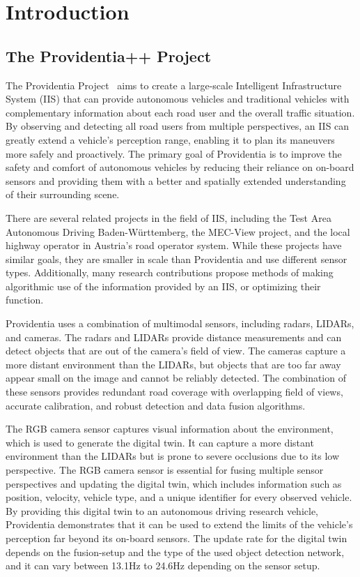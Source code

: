 
\chapter{Introduction}
\label{ch:intro}

\section{The Providentia++ Project}
\label{sec:providentia}

The Providentia Project~\cite{krammer2022providentia} aims to create a large-scale Intelligent Infrastructure System (IIS) that can provide autonomous vehicles and traditional vehicles with complementary information about each road user and the overall traffic situation.
By observing and detecting all road users from multiple perspectives, an IIS can greatly extend a vehicle's perception range, enabling it to plan its maneuvers more safely and proactively.
The primary goal of Providentia is to improve the safety and comfort of autonomous vehicles by reducing their reliance on on-board sensors and providing them with a better and spatially extended understanding of their surrounding scene.

There are several related projects in the field of IIS, including the Test Area Autonomous Driving Baden-Württemberg, the MEC-View project, and the local highway operator in Austria's road operator system.
While these projects have similar goals, they are smaller in scale than Providentia and use different sensor types.
Additionally, many research contributions propose methods of making algorithmic use of the information provided by an IIS, or optimizing their function.

Providentia uses a combination of multimodal sensors, including radars, LIDARs, and cameras.
The radars and LIDARs provide distance measurements and can detect objects that are out of the camera's field of view.
The cameras capture a more distant environment than the LIDARs, but objects that are too far away appear small on the image and cannot be reliably detected.
The combination of these sensors provides redundant road coverage with overlapping field of views, accurate calibration, and robust detection and data fusion algorithms.

The RGB camera sensor captures visual information about the environment, which is used to generate the digital twin.
It can capture a more distant environment than the LIDARs but is prone to severe occlusions due to its low perspective.
The RGB camera sensor is essential for fusing multiple sensor perspectives and updating the digital twin, which includes information such as position, velocity, vehicle type, and a unique identifier for every observed vehicle.
By providing this digital twin to an autonomous driving research vehicle, Providentia demonstrates that it can be used to extend the limits of the vehicle’s perception far beyond its on-board sensors.
The update rate for the digital twin depends on the fusion-setup and the type of the used object detection network, and it can vary between 13.1Hz to 24.6Hz depending on the sensor setup.

